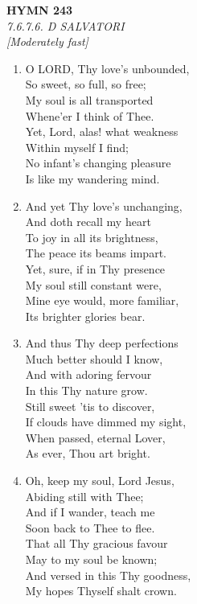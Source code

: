 \newpage
\begin{center}
    {\Large \textbf{HYMN 243}}
    \\
    \textit{7.6.7.6. D SALVATORI}
    \\
    \textit{\small [Moderately fast]}
\end{center}
\vspace{1em}

\begin{enumerate}
    \item O LORD, Thy love's unbounded, \\
            So sweet, so full, so free; \\
        My soul is all transported \\
            Whene'er I think of Thee. \\
        Yet, Lord, alas! what weakness \\
            Within myself I find; \\
        No infant's changing pleasure \\
            Is like my wandering mind.

    \item And yet Thy love's unchanging, \\
            And doth recall my heart \\
        To joy in all its brightness, \\
            The peace its beams impart. \\
        Yet, sure, if in Thy presence \\
            My soul still constant were, \\
        Mine eye would, more familiar, \\
            Its brighter glories bear.

    \item And thus Thy deep perfections \\
            Much better should I know, \\
        And with adoring fervour \\
            In this Thy nature grow. \\
        Still sweet 'tis to discover, \\
            If clouds have dimmed my sight, \\
        When passed, eternal Lover, \\
            As ever, Thou art bright.

    \item Oh, keep my soul, Lord Jesus, \\
            Abiding still with Thee; \\
        And if I wander, teach me \\
            Soon back to Thee to flee. \\
        That all Thy gracious favour \\
            May to my soul be known; \\
        And versed in this Thy goodness, \\
            My hopes Thyself shalt crown.

\end{enumerate}

